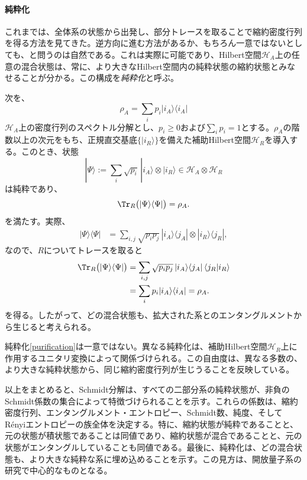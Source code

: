 \documentclass[a4paper,11pt,oneside]{article}
\theoremstyle{definition}
\numberwithin{equation}{section}
\renewcommand{\H}{\mathcal{H}}
\begin{document}
\paragraph{純粋化}



これまでは、全体系の状態から出発し、部分トレースを取ることで縮約密度行列を得る方法を見てきた。逆方向に進む方法があるか、もちろん一意ではないとしても、と問うのは自然である。これは実際に可能であり、Hilbert空間$\mathcal H_A$上の任意の混合状態は、常に、より大きなHilbert空間内の純粋状態の縮約状態とみなせることが分かる。この構成を\textit{純粋化}と呼ぶ。



次を、
\begin{equation}
\rho_A = \sum_i p_i |i_A\rangle\langle i_A|
\end{equation}
$\mathcal H_A$上の密度行列のスペクトル分解とし、$p_i\ge 0$および$\sum_i p_i=1$とする。$\rho_A$の階数以上の次元をもち、正規直交基底$\{|i_R\rangle\}$を備えた補助Hilbert空間$\mathcal H_R$を導入する。このとき、状態
\begin{equation}\label{purification}
|\Psi\rangle
:=
\sum_i \sqrt{p_i}\, |i_A\rangle \otimes |i_R\rangle \in \H_{A}\otimes \H_{R}
\end{equation}
は純粋であり、
\begin{equation}
\Tr_R\bigl(|\Psi\rangle \langle\Psi|\bigr)=\rho_A .
\end{equation}
を満たす。実際、
\begin{align}
|\Psi\rangle\langle\Psi|
&=
\sum_{i,j}\sqrt{p_i p_j}\,
|i_A\rangle\langle j_A|
\otimes
|i_R\rangle\langle j_R| ,
\end{align}
なので、$R$についてトレースを取ると
\begin{align}
\Tr_R\bigl(|\Psi\rangle\langle\Psi|\bigr)
&=
\sum_{i,j}\sqrt{p_i p_j}\,
|i_A\rangle\langle j_A| \,
\langle j_R|i_R\rangle
\nonumber\\
&=
\sum_i p_i |i_A\rangle\langle i_A| =\rho_A .
\end{align}
を得る。したがって、どの混合状態も、拡大された系とのエンタングルメントから生じると考えられる。



純粋化\eqref{purification}は一意ではない。異なる純粋化は、補助Hilbert空間$\mathcal H_R$上に作用するユニタリ変換によって関係づけられる。この自由度は、異なる多数の、より大きな純粋状態から、同じ縮約密度行列が生じうることを反映している。



以上をまとめると、Schmidt分解は、すべての二部分系の純粋状態が、非負のSchmidt係数の集合によって特徴づけられることを示す。これらの係数は、縮約密度行列、エンタングルメント・エントロピー、Schmidt数、純度、そしてR\'enyiエントロピーの族全体を決定する。特に、縮約状態が純粋であることと、元の状態が積状態であることは同値であり、縮約状態が混合であることと、元の状態がエンタングルしていることも同値である。最後に、純粋化は、どの混合状態も、より大きな純粋な系に埋め込めることを示す。この見方は、開放量子系の研究で中心的なものとなる。
\end{document}

